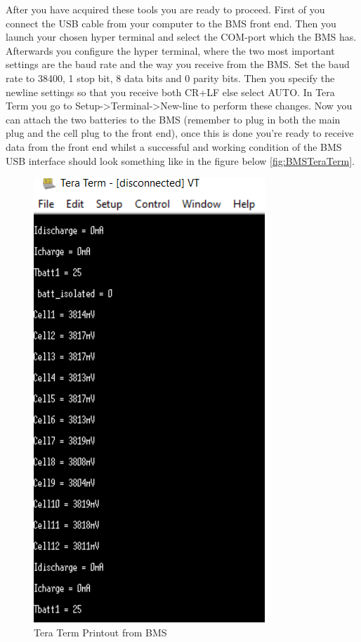 After you have acquired these tools you are ready to proceed. First of you connect the USB cable from your computer to the BMS front end. Then you launch your chosen hyper terminal and select the COM-port which the BMS has. Afterwards you configure the hyper terminal, where the two most important settings are the baud rate and the way you receive from the BMS. Set the baud rate to 38400, 1 stop bit, 8 data bits and 0 parity bits. Then you specify the newline settings so that you receive both CR+LF else select AUTO. In Tera Term you go to Setup->Terminal->New-line to perform these changes. 
Now you can attach the two batteries to the BMS (remember to plug in both the main plug and the cell plug to the front end), once this is done you're ready to receive data from the front end whilst a successful and working condition of the BMS USB interface should look something like in the figure below \vref{fig:BMSTeraTerm}. 
\begin{figure}[H]
	\centering
	\includegraphics[width=0.6\linewidth]{Hardware/Pictures/BMS_teraterm}
	\caption{Tera Term Printout from BMS}
	\label{fig:BMSTeraTerm}
\end{figure}

